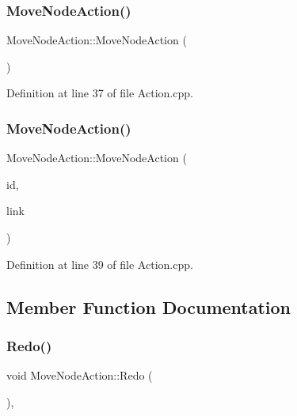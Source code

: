 \subsubsection{\texorpdfstring{Move\+Node\+Action()}{MoveNodeAction()}\hspace{0.1cm}{\footnotesize\ttfamily [1/2]}}
{\footnotesize\ttfamily Move\+Node\+Action\+::\+Move\+Node\+Action (\begin{DoxyParamCaption}{ }\end{DoxyParamCaption})}



Definition at line 37 of file Action.\+cpp.

\mbox{\label{class_move_node_action_a7c2da694794d2637be3b92fd0667445f}} 
\subsubsection{\texorpdfstring{Move\+Node\+Action()}{MoveNodeAction()}\hspace{0.1cm}{\footnotesize\ttfamily [2/2]}}
{\footnotesize\ttfamily Move\+Node\+Action\+::\+Move\+Node\+Action (\begin{DoxyParamCaption}\item[{\hyperlink{_graphical_element_8h_ade5fd6c85839a416577ff9de1605141e}{Element\+Key}}]{id,  }\item[{\hyperlink{class_specific_element_container}{Specific\+Element\+Container}$<$ \hyperlink{class_graphical_node}{Graphical\+Node} $>$ $\ast$}]{link }\end{DoxyParamCaption})}



Definition at line 39 of file Action.\+cpp.



\subsection{Member Function Documentation}
\mbox{\label{class_move_node_action_ae73d7a16920641dcc5b83f671e287223}} 
\subsubsection{\texorpdfstring{Redo()}{Redo()}}
{\footnotesize\ttfamily void Move\+Node\+Action\+::\+Redo (\begin{DoxyParamCaption}{ }\end{DoxyParamCaption})\hspace{0.3cm}{\ttfamily [override]}, {\ttfamily [virtual]}}



